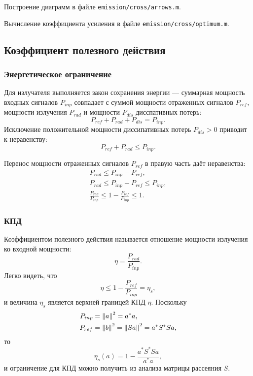 Построение диаграмм в файле \texttt{emission/cross/arrows.m}.

Вычисление коэффициента усиления в файле \texttt{emission/cross/optimum.m}.

\subsection{Коэффициент полезного действия}

\subsubsection{Энергетическое ограничение}

Для излучателя выполняется закон сохранения энергии --- суммарная мощность входных сигналов $P_{inp}$ совпадает с суммой мощности отраженных сигналов $P_{ref}$,
мощности излучения $P_{rad}$ и мощности $P_{dis}$ дисспативных потерь:
\[
    P_{ref} + P_{rad} + P_{dis} = P_{inp} .
\]
Исключение положительной мощности диссипативных потерь $P_{dis} >0$ приводит к неравенству:
\begin{equation}
    \label{emission:emitter:efficiency:power_inequality}
    P_{ref} + P_{rad} \le P_{inp} .
\end{equation}

Перенос мощности отраженных сигналов $P_{ref}$ в правую часть даёт неравенства:
\begin{gather*}
    P_{rad} \le P_{inp} - P_{ref}, \\
    P_{rad} \le P_{inp} - P_{ref} \le P_{inp}, \\
    \frac{P_{rad}}{P_{inp}} \le 1 - \frac{P_{ref}}{P_{inp}} \le 1 .
\end{gather*}

\subsubsection{КПД}
Коэффициентом полезного действия называется отношение мощности излучения ко входной мощности:
\[
    \eta
    = \frac{P_{rad}}{P_{inp}}.
\]
Легко видеть, что
\[
    \eta \le 1 - \frac{P_{ref}}{P_{inp}} = \eta_s ,
\]
и величина $\eta_s$ является верхней границей КПД $\eta$. Поскольку
\begin{align*}
    P_{inp} & = \left \| a \right \|^2 = a^* a , \\
    P_{ref} & = \left \| b \right \|^2 = \left \| S a \right \|^2 = a^* S^* S a \notag,
\end{align*}
то
\[
    \eta_s(a) = 1 - \frac{a^* S^* S a}{a^* a},
\]
и ограничение для КПД можно получить из анализа матрицы рассеяния $S$.

